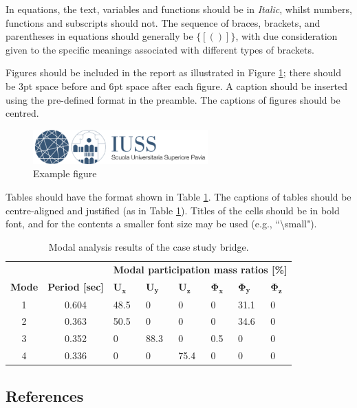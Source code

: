 In equations, the text, variables and functions should be in \textit{Italic}, whilst numbers, functions and subscripts should not. The sequence of braces, brackets, and parentheses in equations should generally be $\{[( )]\}$, with due consideration given to the specific meanings associated with different types of brackets.

Figures should be included in the report as illustrated in Figure \ref{IUSS_logo}; there should be 3pt space before and 6pt space after each figure. A caption should be inserted using the pre-defined format in the preamble. The captions of figures should be centred.

\begin{figure}
	\centering
	\includegraphics[width=0.6\textwidth]{figures_ch1/IUSS_logo.png}
	\caption{Example figure}
	\label{IUSS_logo}
\end{figure}

Tables should have the format shown in Table \ref{tab:modal_analysis}. The captions of tables should be centre-aligned and justified (as in Table \ref{tab:modal_analysis}). Titles of the cells should be in bold font, and for the contents a smaller font size may be used (e.g., ``\textbackslash small").

\begin{table}
	\centering
	\caption{Modal analysis results of the case study bridge.}
	\begin{tabularx}{\textwidth}{ccXXXXXX}
		\hline
		& & \multicolumn{6}{c}{\textbf{Modal participation mass ratios [\%]}} \\ \cline{3-8}
		\textbf{Mode} & \textbf{Period [sec]} & $\bm{U_x}$ & $\bm{U_y}$ & $\bm{U_z}$ & $\bm{\Phi_x}$ & $\bm{\Phi_y}$ & $\bm{\Phi_z}$ \\ \hline
		1 & 0.604 & 48.5 & 0 & 0 & 0 & 31.1 & 0 \\
		2 & 0.363 & 50.5 & 0 & 0 & 0 & 34.6 & 0 \\
		3 & 0.352 & 0 & 88.3 & 0 & 0.5 & 0 & 0 \\
		4 & 0.336 & 0 & 0 & 75.4 & 0 & 0 & 0 \\ \hline
	\end{tabularx}
	\label{tab:modal_analysis}
\end{table}

\subsection{References}


